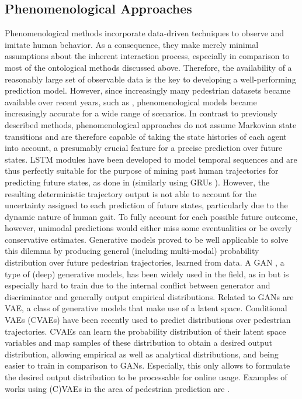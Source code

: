\subsection{Phenomenological Approaches}
Phenomenological methods incorporate data-driven techniques to observe and imitate human behavior. As a consequence, they make merely minimal assumptions about the inherent interaction process, especially in comparison to most of the ontological methods discussed above. Therefore, the availability of a reasonably large set of observable data is the key to developing a well-performing prediction model. However, since increasingly many pedestrian datasets became available over recent years, such as \cite{Pellegrini2009}\cite{Rasouli2019}\cite{Caesar2020}, phenomenological models became increasingly accurate for a wide range of scenarios. 
\newline
In contrast to previously described methods, phenomenological approaches do not assume Markovian state transitions and are therefore capable of taking the state histories of each agent into account, a presumably crucial feature for a precise prediction over future states. \ac{LSTM} modules \cite{Hochreiter1997} have been developed to model temporal sequences and are thus perfectly suitable for the purpose of mining past human trajectories for predicting future states, as done in \cite{Chen2019a}\cite{Hug2018}\cite{Zhang2019}\cite{Jain2016} (similarly using GRUs \cite{Liu2020}). However, the resulting deterministic trajectory output is not able to account for the uncertainty assigned to each prediction of future states, particularly due to the dynamic nature of human gait. To fully account for each possible future outcome, however, unimodal predictions would either miss some eventualities or be overly conservative estimates. 
\newline
Generative models proved to be well applicable to solve this dilemma by producing general (including multi-modal) probability distribution over future pedestrian trajectories, learned from data. A \ac{GAN} \cite{Goodfellow2014}, a type of (deep) generative models, has been widely used in the field, as in \cite{Gupta2018}\cite{Kosaraju2019}\cite{Ouyang2018} but is especially hard to train due to the internal conflict between generator and discriminator and generally output empirical distributions. Related to \ac{GAN}s are \ac{VAE}, a class of generative models that make use of a latent space. Conditional VAEs (CVAEs) have been recently used to predict distributions over pedestrian trajectories. CVAEs can learn the probability distribution of their latent space variables and map samples of these distribution to obtain a desired output distribution, allowing empirical as well as analytical distributions, and being easier to train in comparison to \ac{GAN}s. Especially, this only allows to formulate the desired output distribution to be processable for online usage. Examples of works using (C)\ac{VAE}s in the area of pedestrian prediction are \cite{Ivanovic2018}\cite{Salzmann2020}\cite{Poibrenski2020}\cite{Lee2017}.

